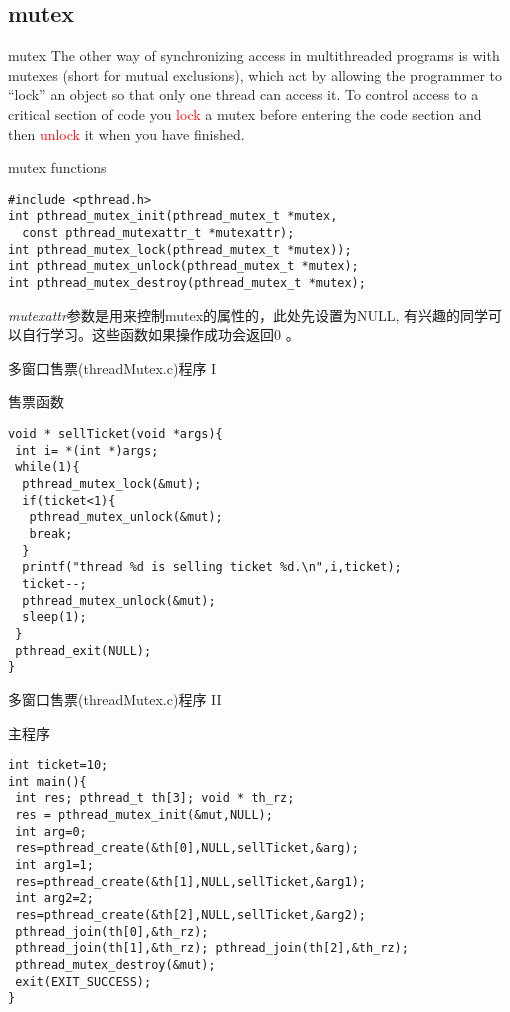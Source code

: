 \documentclass{beamer}
\begin{document}
\subsection{mutex}
\begin{frame}{mutex}
The other way of synchronizing access in multithreaded programs is with mutexes (short for mutual exclusions), which act by allowing the programmer to “lock” an object so that only one thread can access it. To control access to a critical section of code you \textcolor{red}{lock} a mutex before entering the code section and then \textcolor{red}{unlock} it when you have finished.
\end{frame}
\begin{frame}[fragile]{mutex functions}
\begin{block}{}
\begin{verbatim}
#include <pthread.h>
int pthread_mutex_init(pthread_mutex_t *mutex, 
  const pthread_mutexattr_t *mutexattr);
int pthread_mutex_lock(pthread_mutex_t *mutex));
int pthread_mutex_unlock(pthread_mutex_t *mutex); 
int pthread_mutex_destroy(pthread_mutex_t *mutex);
\end{verbatim}
\emph{mutexattr}参数是用来控制mutex的属性的，此处先设置为NULL, 有兴趣的同学可以自行学习。这些函数如果操作成功会返回0 。
\end{block}
\end{frame}

\begin{frame}[fragile]{多窗口售票(threadMutex.c)程序 I}
\begin{block}{售票函数}
\begin{verbatim}
void * sellTicket(void *args){
 int i= *(int *)args;
 while(1){
  pthread_mutex_lock(&mut);
  if(ticket<1){ 
   pthread_mutex_unlock(&mut);
   break;
  }
  printf("thread %d is selling ticket %d.\n",i,ticket);
  ticket--;
  pthread_mutex_unlock(&mut);
  sleep(1);
 }
 pthread_exit(NULL);
}

\end{verbatim}
\end{block}
\end{frame}

\begin{frame}[fragile]{多窗口售票(threadMutex.c)程序 II}
\begin{block}{主程序}
\begin{verbatim}
int ticket=10;
int main(){
 int res; pthread_t th[3]; void * th_rz;
 res = pthread_mutex_init(&mut,NULL);
 int arg=0;
 res=pthread_create(&th[0],NULL,sellTicket,&arg);
 int arg1=1;
 res=pthread_create(&th[1],NULL,sellTicket,&arg1);
 int arg2=2;
 res=pthread_create(&th[2],NULL,sellTicket,&arg2);
 pthread_join(th[0],&th_rz);
 pthread_join(th[1],&th_rz); pthread_join(th[2],&th_rz);
 pthread_mutex_destroy(&mut);
 exit(EXIT_SUCCESS);
}
\end{verbatim}
\end{block}
\end{frame}
\end{document}
